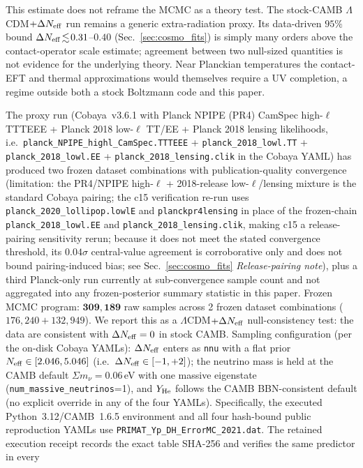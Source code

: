\documentclass[aps,prd,twocolumn,superscriptaddress,showpacs,preprintnumbers,nofootinbib,longbibliography,floatfix]{revtex4-2}
\newcommand{\Neff}{N_{\rm eff}}
\begin{document}
This estimate does not reframe the MCMC as a theory test. The stock-CAMB
$\Lambda$CDM$+\Delta\Neff$ run remains a generic extra-radiation proxy. Its
data-driven $95\%$ bound $\Delta\Neff\!\lesssim\!0.31$--$0.40$
(Sec.~\ref{sec:cosmo_fits}) is simply many orders above the contact-operator
scale estimate; agreement between two null-sized quantities is not evidence
for the underlying theory. Near Planckian temperatures the contact-EFT and
thermal approximations would themselves require a UV completion, a regime
outside both a stock Boltzmann code and this paper.

The proxy run (Cobaya~v3.6.1 with Planck NPIPE (PR4) CamSpec high-$\ell$
TTTEEE + Planck 2018 low-$\ell$ TT/EE + Planck 2018 lensing likelihoods,
i.e.\ \texttt{planck\_NPIPE\_highl\_CamSpec.TTTEEE} +
\texttt{planck\_2018\_lowl.TT} + \texttt{planck\_2018\_lowl.EE} +
\texttt{planck\_2018\_lensing.clik} in the Cobaya YAML)
has produced two frozen dataset combinations with publication-quality
convergence (limitation: the PR4/NPIPE high-$\ell$ + 2018-release
low-$\ell$/lensing mixture is the standard Cobaya pairing; the c15
verification re-run uses \texttt{planck\_2020\_lollipop.lowlE} and
\texttt{planckpr4lensing} in place of the frozen-chain
\texttt{planck\_2018\_lowl.EE} and \texttt{planck\_2018\_lensing.clik},
making c15 a release-pairing sensitivity rerun; because it does not meet the
stated convergence threshold, its $0.04\sigma$ central-value agreement is
corroborative only and does not bound pairing-induced bias; see
Sec.~\ref{sec:cosmo_fits} \emph{Release-pairing note}), plus a third Planck-only run currently at sub-convergence
sample count and not aggregated into any frozen-posterior summary statistic
in this paper. Frozen MCMC program: $\mathbf{309{,}189}$ raw samples
across 2 frozen dataset combinations ($176{,}240 + 132{,}949$).
We report this as a $\Lambda$CDM$+\Delta\Neff$ null-consistency test: the data
are consistent with $\Delta\Neff=0$ in stock CAMB.
Sampling configuration (per the on-disk Cobaya YAMLs): $\Delta\Neff$ enters
as \texttt{nnu} with a flat prior $\Neff\in[2.046, 5.046]$
(i.e.\ $\Delta\Neff\in[-1,+2]$); the neutrino mass is held at the CAMB
default $\Sigma m_\nu = 0.06$\,eV with one massive eigenstate
(\texttt{num\_massive\_neutrinos}=1), and $Y_{\rm He}$ follows the CAMB
BBN-consistent default (no explicit override in any of the four YAMLs).
Specifically, the executed Python~3.12/CAMB~1.6.5 environment and all four
hash-bound public reproduction YAMLs use
\texttt{PRIMAT\_Yp\_DH\_ErrorMC\_2021.dat}. The retained execution receipt
records the exact table SHA-256 and verifies the same predictor in every
\end{document}
